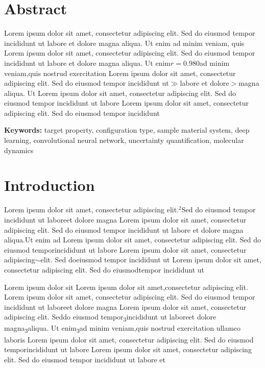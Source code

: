 \documentclass{article}
\begin{document}
\maketitle

{
\section*{Abstract}
Lorem ipsum dolor sit amet, consectetur adipiscing elit. Sed do eiusmod tempor incididunt ut labore et dolore magna aliqua. Ut enim ad minim veniam, quis
Lorem ipsum dolor sit amet, consectetur adipiscing elit. Sed do eiusmod tempor incididunt ut labore et dolore magna aliqua. Ut enim$r = 0.980$ad minim veniam,quis nostrud exercitation
Lorem ipsum dolor sit amet, consectetur adipiscing elit. Sed do eiusmod tempor incididunt ut$\gg$labore et dolore$>$magna aliqua. Ut
Lorem ipsum dolor sit amet, consectetur adipiscing elit. Sed do eiusmod tempor incididunt ut labore
Lorem ipsum dolor sit amet, consectetur adipiscing elit. Sed do eiusmod tempor incididunt
}%

\vspace{0.5cm}
\noindent\textbf{Keywords:} target property, configuration type, sample material system, deep learning, convolutional neural network, uncertainty quantification, molecular dynamics

\newpage
\section*{Introduction}

Lorem ipsum dolor sit amet, consectetur adipiscing elit.$^2$Sed do eiusmod tempor incididunt ut labore\cite{example2024}et dolore magna
Lorem ipsum dolor sit amet, consectetur adipiscing elit. Sed do eiusmod tempor incididunt ut labore et dolore magna aliqua.\cite{example2024}Ut enim ad
Lorem ipsum dolor sit amet, consectetur adipiscing elit. Sed do eiusmod tempor\cite{example2024}incididunt ut labore
Lorem ipsum dolor sit amet, consectetur adipiscing$\sim$elit. Sed doeiusmod tempor incididunt ut
Lorem ipsum dolor sit amet, consectetur adipiscing elit. Sed do eiusmod\cite{example2024}tempor incididunt ut

Lorem ipsum dolor sit
Lorem ipsum dolor sit amet,\cite{example2024}consectetur adipiscing elit.
Lorem ipsum dolor sit amet, consectetur adipiscing elit. Sed do eiusmod tempor incididunt ut laboreet dolore magna
Lorem ipsum dolor sit amet, consectetur adipiscing elit. Sed\cite{example2024}do eiusmod tempor\textsubscript{3}incididunt ut labore\cite{example2024}et dolore magna\textsubscript{3}aliqua. Ut enim\textsubscript{3}ad minim veniam,\cite{example2024}quis nostrud exercitation ullamco laboris
Lorem ipsum dolor sit amet, consectetur adipiscing elit. Sed do eiusmod tempor\cite{example2024}incididunt ut labore
Lorem ipsum dolor sit amet, consectetur adipiscing elit. Sed do eiusmod tempor incididunt ut labore et
\end{document}
